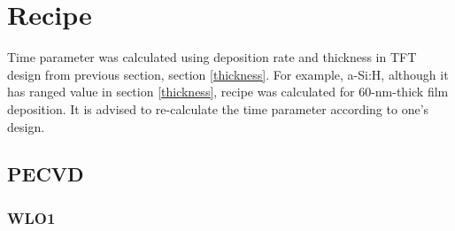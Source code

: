 \chapter{Recipe}
Time parameter was calculated using deposition rate and thickness in TFT design from previous section, section \ref{thickness}. For example, a-Si:H, although it has ranged value in section \ref{thickness}, recipe was calculated for 60-nm-thick film deposition. It is advised to re-calculate the time parameter according to one's design. 
\section{PECVD}
\subsection{WLO1}
